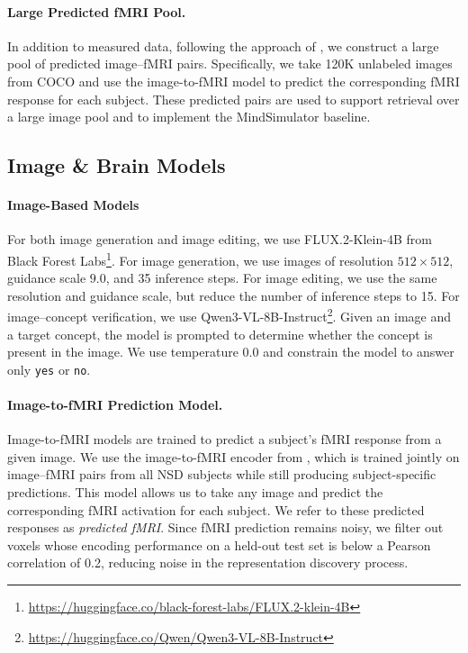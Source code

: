 \documentclass{article}
\begin{document}
\vspace{-0.15cm}
\paragraph{Large Predicted fMRI Pool.}
In addition to measured data, following the approach of \citet{Bao2025MindSimulator}, we construct a large pool of predicted image--fMRI pairs. Specifically, we take 120K unlabeled images from COCO and use the image-to-fMRI model to predict the corresponding fMRI response for each subject. These predicted pairs are used to support retrieval over a large image pool and to implement the MindSimulator baseline.


\subsection{Image \& Brain Models}
\label{sec_sup:image-brain_models}

\paragraph{Image-Based Models}
For both image generation and image editing, we use FLUX.2-Klein-4B from Black Forest Labs\footnote{\url{https://huggingface.co/black-forest-labs/FLUX.2-klein-4B}}.
For image generation, we use images of resolution $512 \times 512$, guidance scale $9.0$, and 35 inference steps. For image editing, we use the same resolution and guidance scale, but reduce the number of inference steps to 15.
For image--concept verification, we use Qwen3-VL-8B-Instruct\footnote{\url{https://huggingface.co/Qwen/Qwen3-VL-8B-Instruct}}.
Given an image and a target concept, the model is prompted to determine whether the concept is present in the image. We use temperature $0.0$ and constrain the model to answer only \texttt{yes} or \texttt{no}.

\vspace{-0.15cm}
\paragraph{Image-to-fMRI Prediction Model.}
Image-to-fMRI models are trained to predict a subject's fMRI response from a given image. We use the image-to-fMRI encoder from \citet{Beliy2024Wisdom}, which is trained jointly on image--fMRI pairs from all NSD subjects while still producing subject-specific predictions. This model allows us to take any image and predict the corresponding fMRI activation for each subject. We refer to these predicted responses as \emph{predicted fMRI}. Since fMRI prediction remains noisy, we filter out voxels whose encoding performance on a held-out test set is below a Pearson correlation of 0.2, reducing noise in the representation discovery process.
\end{document}

